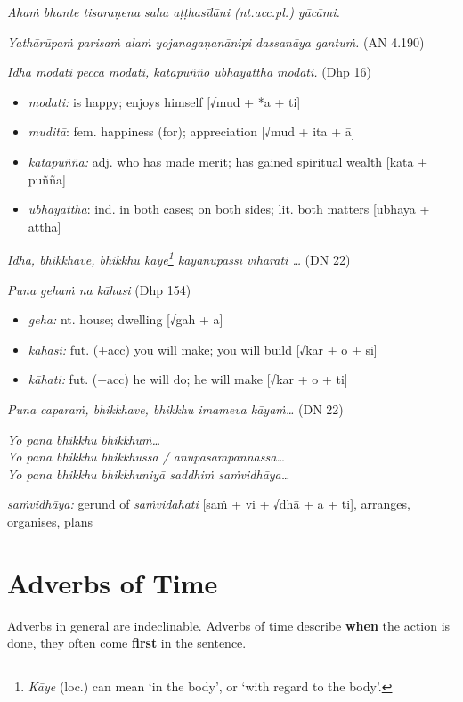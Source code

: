 \documentclass[11pt,oneside]{memoir}
\begin{document}
\emph{Ahaṁ bhante tisaraṇena saha aṭṭhasīlāni (nt.acc.pl.) yācāmi.}

\emph{Yathārūpaṁ parisaṁ alaṁ yojanagaṇanānipi dassanāya gantuṁ.} (AN 4.190)

\emph{Idha modati pecca modati, katapuñño ubhayattha modati.} (Dhp 16)

\begin{itemize}
\item \emph{modati:} is happy; enjoys himself [√mud + *a + ti]
\item \emph{muditā}: fem. happiness (for); appreciation [√mud + ita + ā]
\item \emph{katapuñña:} adj. who has made merit; has gained spiritual wealth [kata + puñña]
\item \emph{ubhayattha}: ind. in both cases; on both sides; lit. both matters [ubhaya + attha]
\end{itemize}

\emph{Idha, bhikkhave, bhikkhu kāye\footnote{\emph{Kāye} (loc.) can mean `in the body', or `with regard to the body'.} kāyānupassī viharati \ldots{}} (DN 22)

\emph{Puna gehaṁ na kāhasi} (Dhp 154)

\begin{itemize}
\item \emph{geha:} nt. house; dwelling [√gah + a]
\item \emph{kāhasi:} fut. (+acc) you will make; you will build [√kar + o + si]
\item \emph{kāhati:} fut. (+acc) he will do; he will make [√kar + o + ti]
\end{itemize}

\emph{Puna caparaṁ, bhikkhave, bhikkhu imameva kāyaṁ\ldots{}} (DN 22)

\emph{Yo pana bhikkhu bhikkhuṁ\ldots{}} \\[0pt]
\emph{Yo pana bhikkhu bhikkhussa / anupasampannassa\ldots{}} \\[0pt]
\emph{Yo pana bhikkhu bhikkhuniyā saddhiṁ saṁvidhāya\ldots{}}

\emph{saṁvidhāya:} gerund of \emph{saṁvidahati} [saṁ + vi + √dhā + a + ti], arranges, organises, plans

\clearpage

\section{Adverbs of Time}
\label{sec:org0f11d35}

Adverbs in general are indeclinable. Adverbs of time describe \textbf{when} the action
is done, they often come \textbf{first} in the sentence.
\end{document}
